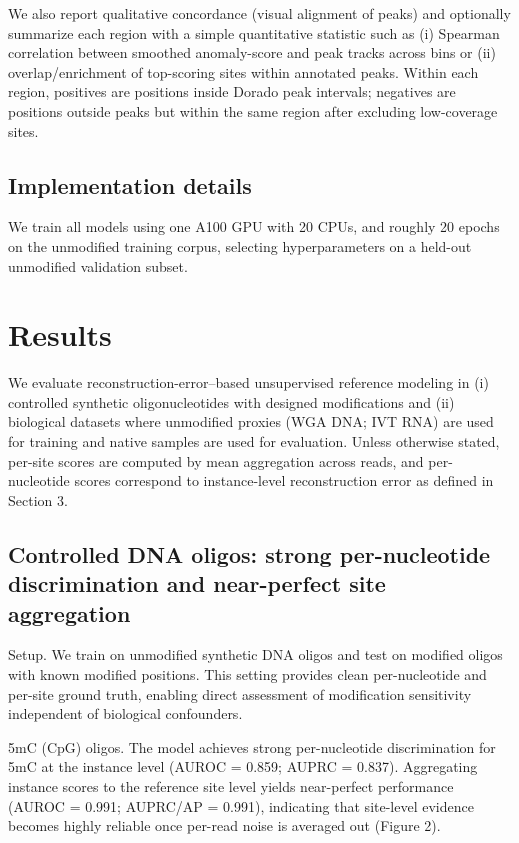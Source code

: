 \documentclass[sigconf, review]{acmart}
\begin{document}
We also report qualitative concordance (visual alignment of peaks) and optionally summarize each region with a simple quantitative statistic such as (i) Spearman correlation between smoothed anomaly-score and peak tracks across bins or (ii) overlap/enrichment of top-scoring sites within annotated peaks. Within each region, positives are positions inside Dorado peak intervals; negatives are positions outside peaks but within the same region after excluding low-coverage sites.

\subsection{Implementation details}
We train all models using one A100 GPU with 20 CPUs, and roughly 20 epochs on the unmodified training corpus, selecting hyperparameters on a held-out unmodified validation subset.

\section{Results}
We evaluate reconstruction-error--based unsupervised reference modeling in (i) controlled synthetic oligonucleotides with designed modifications and (ii) biological datasets where unmodified proxies (WGA DNA; IVT RNA) are used for training and native samples are used for evaluation. Unless otherwise stated, per-site scores are computed by mean aggregation across reads, and per-nucleotide scores correspond to instance-level reconstruction error as defined in Section 3.

\subsection{Controlled DNA oligos: strong per-nucleotide discrimination and near-perfect site aggregation}

Setup. We train on unmodified synthetic DNA oligos and test on modified oligos with known modified positions. This setting provides clean per-nucleotide and per-site ground truth, enabling direct assessment of modification sensitivity independent of biological confounders.

5mC (CpG) oligos. The model achieves strong per-nucleotide discrimination for 5mC at the instance level (AUROC = 0.859; AUPRC = 0.837). Aggregating instance scores to the reference site level yields near-perfect performance (AUROC = 0.991; AUPRC/AP = 0.991), indicating that site-level evidence becomes highly reliable once per-read noise is averaged out (Figure 2).
\end{document}
